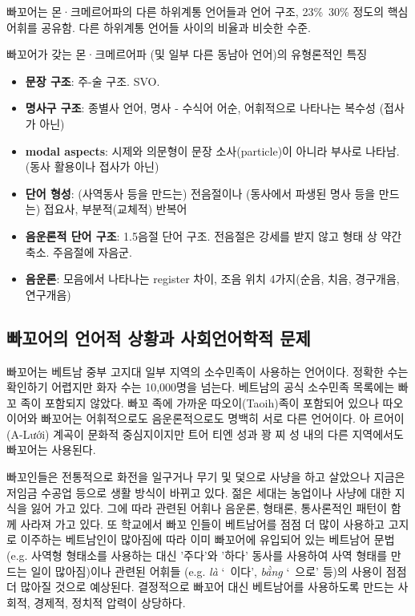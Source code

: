 빠꼬어는 몬·크메르어파의 다른 하위계통 언어들과 언어 구조, 23\%~30\% 정도의 핵심어휘를 공유함. 다른 하위계통 언어들 사이의 비율과 비슷한 수준.

빠꼬어가 갖는 몬·크메르어파 (및 일부 다른 동남아 언어)의 유형론적인 특징
\begin{itemize}
\item \textbf{문장 구조}: 주-술 구조. SVO.
\item \textbf{명사구 구조}: 종별사 언어, 명사 - 수식어 어순, 어휘적으로 나타나는 복수성 (접사가 아닌)
\item \textbf{modal aspects}: 시제와 의문형이 문장 소사(particle)이 아니라 부사로 나타남. (동사 활용이나 접사가 아닌)
\item \textbf{단어 형성}: (사역동사 등을 만드는) 전음절이나 (동사에서 파생된 명사 등을 만드는) 접요사, 부분적(교체적) 반복어
\item \textbf{음운론적 단어 구조}: 1.5음절 단어 구조. 전음절은 강세를 받지 않고 형태 상 약간 축소. 주음절에 자음군.
\item \textbf{음운론}: 모음에서 나타나는 register 차이, 조음 위치 4가지(순음, 치음, 경구개음, 연구개음)
\end{itemize}

\subsection{빠꼬어의 언어적 상황과 사회언어학적 문제}
빠꼬어는 베트남 중부 고지대 일부 지역의 소수민족이 사용하는 언어이다. 정확한 수는 확인하기 어렵지만 화자 수는 10,000명을 넘는다. 베트남의 공식 소수민족 목록에는 빠꼬 족이 포함되지 않았다. 빠꼬 족에 가까운 따오이(Taoih)족이 포함되어 있으나 따오이어와 빠꼬어는 어휘적으로도 음운론적으로도 명백히 서로 다른 언어이다. 아 르어이(A-Lưới) 계곡이 문화적 중심지이지만 트어 티엔 성과 꽝 찌 성 내의 다른 지역에서도 빠꼬어는 사용된다.

빠꼬인들은 전통적으로 화전을 일구거나 무기 및 덫으로 사냥을 하고 살았으나 지금은 저임금 수공업 등으로 생활 방식이 바뀌고 있다. 젊은 세대는 농업이나 사냥에 대한 지식을 잃어 가고 있다. 그에 따라 관련된 어휘나 음운론, 형태론, 통사론적인 패턴이 함께 사라져 가고 있다. 또 학교에서 빠꼬 인들이 베트남어를 점점 더 많이 사용하고 고지로 이주하는 베트남인이 많아짐에 따라 이미 빠꼬어에 유입되어 있는 베트남어 문법 (e.g. 사역형 형태소를 사용하는 대신 '주다'와 '하다' 동사를 사용하여 사역 형태를 만드는 일이 많아짐)이나 관련된 어휘들 (e.g. {\itshape{là}} ‘~이다’, {\itshape{bằng}} ‘~으로’ 등)의 사용이 점점 더 많아질 것으로 예상된다. 결정적으로 빠꼬어 대신 베트남어를 사용하도록 만드는 사회적, 경제적, 정치적 압력이 상당하다.

